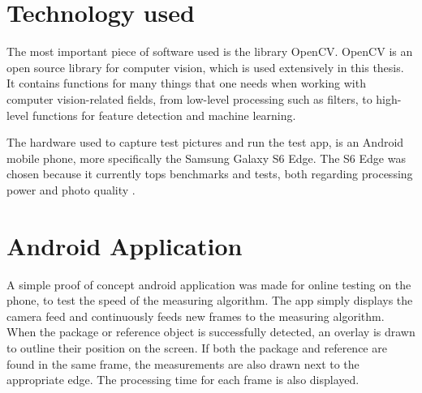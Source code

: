 \section{Technology used}

The most important piece of software used is the library OpenCV.
OpenCV is an open source library for computer vision, which is used extensively in this thesis. 
It contains functions for many things that one needs when working with computer vision-related fields, from low-level processing such as filters, to high-level functions for feature detection and machine learning.

The hardware used to capture test pictures and run the test app, is an Android mobile phone, more specifically the Samsung Galaxy S6 Edge.
The S6 Edge was chosen because it currently tops benchmarks and tests, both regarding processing power and photo quality \cite{phone_performance_benchmark}\cite{phone_camera_benchmark}.

\section{Android Application}
A simple proof of concept android application was made for online testing on the phone, to test the speed of the measuring algorithm.
The app simply displays the camera feed and continuously feeds new frames to the measuring algorithm.
When the package or reference object is successfully detected, an overlay is drawn to outline their position on the screen.
If both the package and reference are found in the same frame, the measurements are also drawn next to the appropriate edge.
The processing time for each frame is also displayed.






